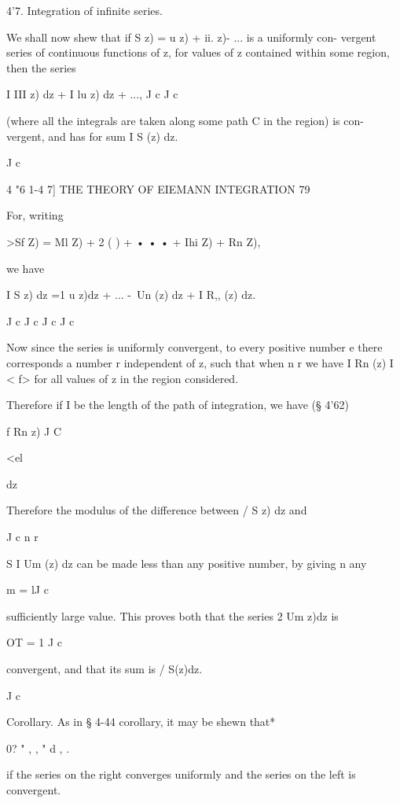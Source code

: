 4'7. Integration of infinite series. 

We shall now shew that if S  z) = u   z) + ii.   z)-  ... is a uniformly con- 
vergent series of continuous functions of z, for values of z contained within 
some region, then the series 

I III  z) dz + I lu  z) dz + ..., 
J c J c 

(where all the integrals are taken along some path C in the region) is con- 
vergent, and has for sum I S (z) dz. 

J c 



4 "6 1-4 7] THE THEORY OF EIEMANN INTEGRATION 79 

For, writing 

>Sf  Z) = Ml  Z) +  2 ( ) + • • • + Ihi  Z) + Rn  Z), 

we have 

I S  z) dz =1 u  z)dz + ... -\ Un (z) dz + I R,, (z) dz. 

J c J c J c J c 

Now since the series is uniformly convergent, to every positive number e 
there corresponds a number r independent of z, such that when n   r we have 
I Rn (z) I < f> for all values of z in the region considered. 

Therefore if I be the length of the path of integration, we have (§ 4'62) 



f Rn z) 
J C 



<el 



dz 

Therefore the modulus of the difference between / S  z) dz and 

J c 
n r 

S I Um (z) dz can be made less than any positive number, by giving n any 

m = lJ c 

sufficiently large value. This proves both that the series 2 Um z)dz is 

OT = 1 J c 

convergent, and that its sum is / S(z)dz. 

J c 

Corollary. As in § 4-44 corollary, it may be shewn that* 

0? " , , "  d , . 

if the series on the right converges uniformly and the series on the left is convergent. 


